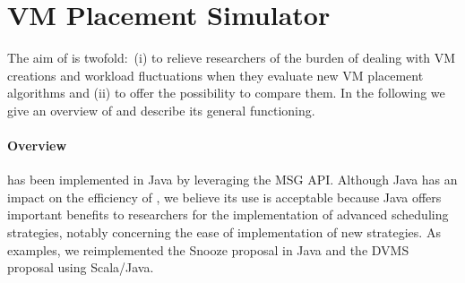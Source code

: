 \vspace*{-.2cm}
\section{VM Placement Simulator}
\label{sec:injector}
\vspace*{-.1cm}

The aim of \vmps is twofold:~(i) to relieve researchers of the burden of
dealing with VM creations and workload fluctuations when they evaluate
new VM placement algorithms and (ii) to offer the possibility to
compare them.
%
In the following we give an overview of \vmps and describe its
general functioning.

\vspace*{-.1cm}
\paragraph{Overview}
\label{sec:overview}

\vmps has been implemented in Java by leveraging the \sg MSG API.
Although Java has an impact on the efficiency
of \sg, we believe its use is acceptable because Java offers important
benefits to researchers for the implementation of advanced scheduling
strategies, notably concerning the ease of implementation of new
strategies. As examples, we reimplemented the Snooze proposal in Java
and the DVMS proposal using Scala/Java.

